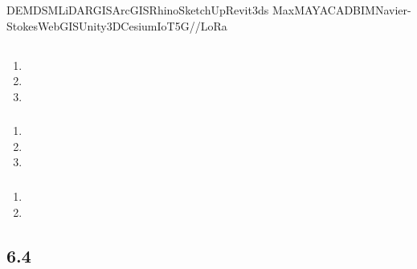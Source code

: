DEMDSMLiDARGISArcGISRhinoSketchUpRevit3ds
MaxMAYACADBIMNavier-StokesWebGISUnity3DCesiumIoT5G//LoRa

\hypertarget{section-88}{%
\subsection{}\label{section-88}}

\hypertarget{section-89}{%
\subsubsection{}\label{section-89}}

\begin{enumerate}
\def\labelenumi{\arabic{enumi}.}
\tightlist
\item
\item
\item
\end{enumerate}

\hypertarget{section-90}{%
\subsubsection{}\label{section-90}}

\begin{enumerate}
\def\labelenumi{\arabic{enumi}.}
\tightlist
\item
\item
\item
\end{enumerate}

\hypertarget{section-91}{%
\subsubsection{}\label{section-91}}

\begin{enumerate}
\def\labelenumi{\arabic{enumi}.}
\tightlist
\item
\item
\end{enumerate}

\hypertarget{section-92}{%
\subsection{}\label{section-92}}

\hypertarget{section-93}{%
\subsection{6.4}\label{section-93}}

